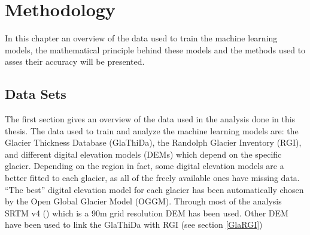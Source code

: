 \chapter{Methodology}\label{chap2}
\thispagestyle{plain}
In this chapter an overview of the data used to train the machine learning models, the mathematical principle behind these models and the methods used to asses their accuracy will be presented. 





\section{Data Sets}\label{glathida}
The first section gives an overview of the data used in the analysis done in this thesis. The data used to train and analyze the machine learning models are: the Glacier Thickness Database (GlaThiDa), the Randolph Glacier Inventory (RGI), and different digital elevation models (DEMs) which depend on the specific glacier. Depending on the region in fact, some digital elevation models are a better fitted to each glacier, as all of the freely available ones have missing data. ``The best'' digital elevation model for each glacier has been automatically chosen by the Open Global Glacier Model (OGGM). Through most of the analysis SRTM v4 (\citet{SRTM}) which is a 90m grid resolution DEM has been used. Other DEM have been used to link the GlaThiDa with RGI (see section \ref{GlaRGI})

